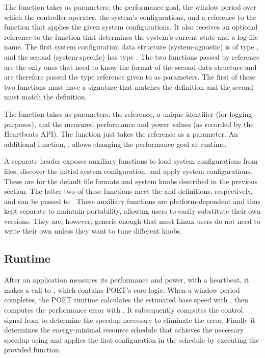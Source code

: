 The  function takes as parameters: the performance goal, the window period over which the controller operates, the system's configurations, and a reference to the function that applies the given system configurations.
It also receives an optional reference to the function that determines the system's current state and a log file name.
The first system configuration data structure (system-agnostic) is of type , and the second (system-specific) has type .
The two functions passed by reference are the only ones that need to know the format of the second data structure and are therefore passed the  type reference given to  as parameters.
The first of these two functions must have a signature that matches the  definition and the second must match the  definition.

The  function takes as parameters: the  reference, a unique identifier (for logging purposes), and the measured performance and power values (\eg as recorded by the Heartbeats API).
The  function just takes the  reference as a parameter.
An additional function, , allows changing the performance goal at runtime.

A separate header exposes auxiliary functions to load system configurations from files, discover the initial system configuration, and apply system configurations.
These are for the default file formats and system knobs described in the previous section.
The latter two of these functions meet the  and  definitions, respectively, and can be passed to .
These auxiliary functions are platform-dependent and thus kept separate to maintain portability, allowing users to easily substitute their own versions.
They are, however, generic enough that most Linux users do not need to write their own unless they want to tune different knobs.


\subsection{Runtime}

After an application measures its performance and power, \eg with a heartbeat, it makes a call to , which contains POET's core logic.
When a window period completes, the POET runtime calculates the estimated base speed with , then computes the performance error with .
It subsequently computes the control signal from  to determine the speedup necessary to eliminate the error.
Finally it determines the energy-minimal resource schedule that achieves the necessary speedup using  and applies the first configuration in the schedule by executing the provided  function.

